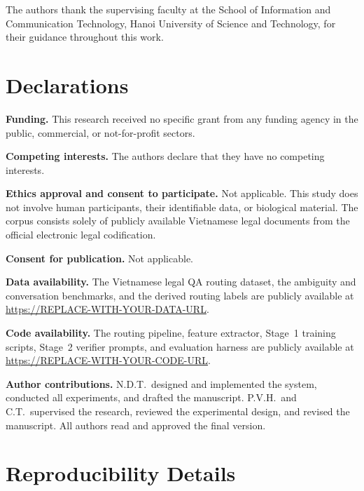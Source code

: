\documentclass[pdflatex,sn-mathphys-num]{sn-jnl}
\begin{document}
\backmatter

The authors thank the supervising faculty at the School of Information and
Communication Technology, Hanoi University of Science and Technology, for their
guidance throughout this work.

\section*{Declarations}


\noindent\textbf{Funding.} This research received no specific grant from any
funding agency in the public, commercial, or not-for-profit sectors.

\noindent\textbf{Competing interests.} The authors declare that they have no
competing interests.

\noindent\textbf{Ethics approval and consent to participate.} Not applicable.
This study does not involve human participants, their identifiable data, or
biological material. The corpus consists solely of publicly available
Vietnamese legal documents from the official electronic legal codification.

\noindent\textbf{Consent for publication.} Not applicable.

\noindent\textbf{Data availability.} The Vietnamese legal QA routing dataset,
the ambiguity and conversation benchmarks, and the derived routing labels are
publicly available at \url{https://REPLACE-WITH-YOUR-DATA-URL}.

\noindent\textbf{Code availability.} The routing pipeline, feature extractor,
Stage~1 training scripts, Stage~2 verifier prompts, and evaluation harness are
publicly available at \url{https://REPLACE-WITH-YOUR-CODE-URL}.

\noindent\textbf{Author contributions.} N.D.T.\ designed and implemented the
system, conducted all experiments, and drafted the manuscript. P.V.H.\ and
C.T.\ supervised the research, reviewed the experimental design, and revised
the manuscript. All authors read and approved the final version.

\appendix

\section{Reproducibility Details}\label{app:repro}
\end{document}
